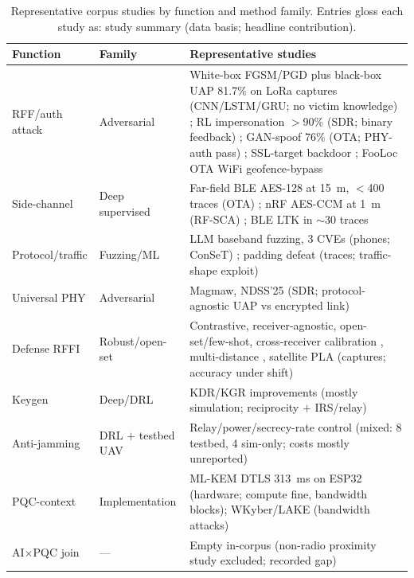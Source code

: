 \documentclass[10.5pt,compsoc,winfonts]{ICN}
\newcommand{\upcite}[1]{\cite{#1}}
\begin{document}
\begin{table}[tbp]
\centering
\footnotesize
\setlength{\tabcolsep}{3pt}
\caption{Representative corpus studies by function and method family. Entries gloss each study as: study summary (data basis; headline contribution).}
\label{tab:representative}
\begin{tabular}{@{}>{\raggedright\arraybackslash}p{2.4cm} >{\raggedright\arraybackslash}p{2.4cm} >{\raggedright\arraybackslash}p{9.2cm}@{}}
\toprule
Function & Family & Representative studies \\
\midrule
RFF/auth attack & Adversarial & White-box FGSM/PGD plus black-box UAP 81.7\% on LoRa captures (CNN/LSTM/GRU; no victim knowledge) \upcite{T03}; RL impersonation $>$90\% (SDR; binary feedback) \upcite{T18}; GAN-spoof 76\% (OTA; PHY-auth pass) \upcite{T09}; SSL-target backdoor \upcite{T41}; FooLoc OTA WiFi geofence-bypass \upcite{T42} \\
Side-channel & Deep supervised & Far-field BLE AES-128 at 15~m, $<$400 traces (OTA) \upcite{T01}; nRF AES-CCM at 1~m (RF-SCA) \upcite{T08}; BLE LTK in $\sim$30 traces \\
Protocol/traffic & Fuzzing/ML & LLM baseband fuzzing, 3 CVEs (phones; ConSeT) \upcite{T28}; padding defeat (traces; traffic-shape exploit) \upcite{T19} \\
Universal PHY & Adversarial & Magmaw, NDSS'25 (SDR; protocol-agnostic UAP vs encrypted link) \upcite{T30} \\
Defense RFFI & Robust/open-set & Contrastive, receiver-agnostic, open-set/few-shot, cross-receiver calibration \upcite{D75}, multi-distance \upcite{D73}, satellite PLA \upcite{D71} (captures; accuracy under shift) \\
Keygen & Deep/DRL & KDR/KGR improvements (mostly simulation; reciprocity $+$ IRS/relay) \\
Anti-jamming & DRL $+$ testbed UAV & Relay/power/secrecy-rate control (mixed: 8 testbed, 4 sim-only; costs mostly unreported) \\
PQC-context & Implementation & ML-KEM DTLS 313~ms on ESP32 (hardware; compute fine, bandwidth blocks); WKyber/LAKE (bandwidth attacks) \upcite{P08}\upcite{P11} \\
AI$\times$PQC join & — & Empty in-corpus (non-radio proximity study excluded; recorded gap) \\
\bottomrule
\end{tabular}
\end{table}
\end{document}
